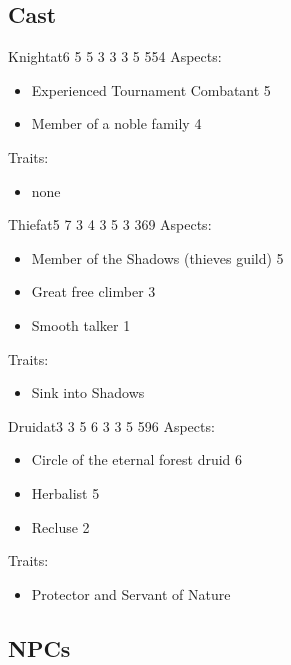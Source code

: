 \documentclass[11pt]{article}
\begin{document}
{\subsection{Cast}
\label{sec:orgcbbef17}

\begin{npc}{Knight}{at}{6 5 5 3 3 3 5 5}{54}
Aspects:
\begin{itemize}
\item Experienced Tournament Combatant 5
\item Member of a noble family 4
\end{itemize}

\columnbreak

Traits:
\begin{itemize}
\item none
\end{itemize}
\end{npc}

\begin{npc}{Thief}{at}{5 7 3 4 3 5 3 3}{69}
Aspects:
\begin{itemize}
\item Member of the Shadows (thieves guild) 5
\item Great free climber 3
\item Smooth talker 1
\end{itemize}

\columnbreak

Traits:
\begin{itemize}
\item Sink into Shadows
\end{itemize}
\end{npc}

\begin{npc}{Druid}{at}{3 3 5 6 3 3 5 5}{96}
Aspects:
\begin{itemize}
\item Circle of the eternal forest druid 6
\item Herbalist 5
\item Recluse 2
\end{itemize}

\columnbreak

Traits:
\begin{itemize}
\item Protector and Servant of Nature
\end{itemize}
\end{npc}
\subsection{NPCs}
\label{sec:org3fb5f3a}

}
\end{document}
